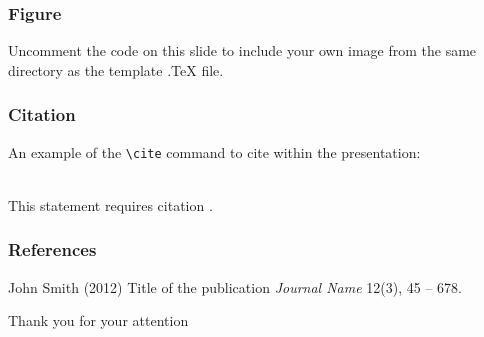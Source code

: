 \documentclass{beamer}
\begin{document}
	
\begin{frame}
\frametitle{Figure}
Uncomment the code on this slide to include your own image from the same directory as the template .TeX file.
\end{frame}


\begin{frame}[fragile] %
\frametitle{Citation}
An example of the \verb|\cite| command to cite within the presentation:\\~

This statement requires citation \cite{p1}.
\end{frame}

	
\begin{frame}
\frametitle{References}
\footnotesize{
\begin{thebibliography}{99} %
 John Smith (2012)
\newblock Title of the publication
\newblock \emph{Journal Name} 12(3), 45 -- 678.
\end{thebibliography}
}
\end{frame}


\begin{frame}
\Huge{\centerline{\LARGE {} Thank you for your attention}}
\end{frame}
\end{document}
